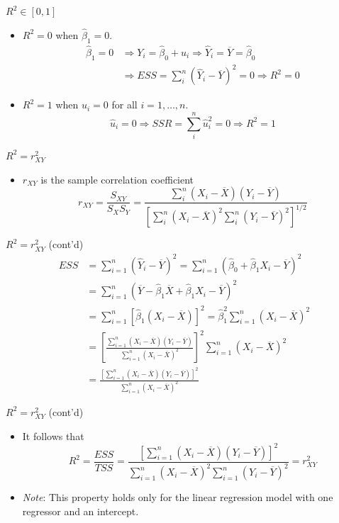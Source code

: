 \documentclass[presentation]{beamer}
\begin{document}
\begin{frame}[label={sec:org19ca530}]{\(R^2 \in [0, 1]\)}
\begin{itemize}
\item \(R^2 = 0\) when \(\hat{\beta}_1 = 0\).
\begin{align*}
\hat{\beta}_1 = 0 &\Rightarrow Y_i = \hat{\beta}_0 + \hat{u}_i
\Rightarrow \hat{Y}_i = \overline{Y} = \hat{\beta}_0 \\ 
&\Rightarrow ESS
= \sum_i^n (\hat{Y}_i - \overline{Y})^2 = 0 \Rightarrow R^2 = 0
\end{align*}
\item \(R^2 = 1\) when \(\hat{u}_i = 0\) for all \(i = 1, \ldots, n\).
\[ \hat{u}_i = 0 \Rightarrow SSR = \sum_i^n \hat{u}_i^2 = 0
  \Rightarrow R^2 = 1 \]
\end{itemize}
\end{frame}

\begin{frame}[label={sec:orgd252d92}]{\(R^2 = r^2_{XY}\)}
\begin{itemize}
\item \(r_{XY}\) is the sample correlation coefficient
\[ r_{XY} = \frac{S_{XY}}{S_X S_Y} = \frac{\sum_i^n(X_i -
  \overline{X})(Y_i - \overline{Y})}{\left[\sum_i^n (X_i - \overline{X})^2 \sum_i^n (Y_i -
  \overline{Y})^2 \right]^{1/2}} \]
\end{itemize}
\end{frame}

\begin{frame}[label={sec:org737c598}]{\(R^2 = r^2_{XY}\) (cont'd)}
\begin{align*}
ESS &= \sum_{i=1}^n (\hat{Y}_i - \overline{Y})^2 = \sum_{i=1}^n (\hat{\beta}_0 + \hat{\beta}_1 X_i - \overline{Y})^2 \\
&= \sum_{i=1}^n (\overline{Y} - \hat{\beta}_1 \overline{X} + \hat{\beta}_1 X_i - \overline{Y})^2 \\
&= \sum_{i=1}^n \left[ \hat{\beta}_1 (X_i - \overline{X}) \right]^2 = \hat{\beta}_1^2 \sum_{i=1}^n (X_i - \overline{X})^2 \\
&= \left[\frac{\sum_{i=1}^n (X_i - \overline{X})(Y_i - \overline{Y})}{\sum_{i=1}^n (X_i - \overline{X})^2}\right]^2 \sum_{i=1}^n (X_i - \overline{X})^2 \\
&= \frac{\left[ \sum_{i=1}^n (X_i - \overline{X})(Y_i - \overline{Y}) \right]^2}{\sum_{i=1}^n (X_i - \overline{X})^2}
\end{align*}
\end{frame}

\begin{frame}[label={sec:org3f36e57}]{\(R^2 = r^2_{XY}\) (cont'd)}
\begin{itemize}
\item It follows that
\[
  R^2 = \frac{ESS}{TSS} = \frac{\left[ \sum_{i=1}^n (X_i - \overline{X})(Y_i - \overline{Y}) \right]^2}{\sum_{i=1}^n (X_i - \overline{X})^2 \sum_{i=1}^n (Y_i - \overline{Y})^2} = r^2_{XY}
  \]

\item \emph{Note}: This property holds only for the linear regression model
with \alert{one regressor and an intercept}.
\end{itemize}
\end{frame}
\end{document}

